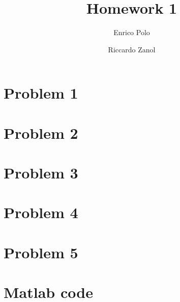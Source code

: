 \documentclass{article}
\author{Enrico Polo \and Riccardo Zanol}
\title{Homework 1}
\begin{document}
\maketitle
\section*{Problem 1}
\section*{Problem 2}
\section*{Problem 3}
\section*{Problem 4}
\section*{Problem 5}
\section*{Matlab code}
\end{document}
